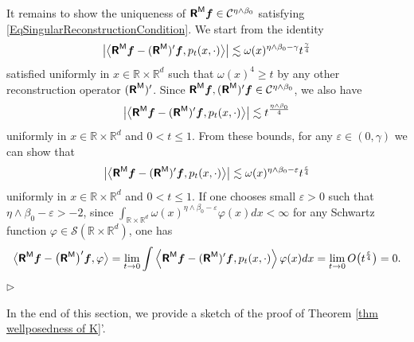 \documentclass[10pt, reqno]{amsart}
\numberwithin{subsection}{section}
\numberwithin{subsubsection}{subsection}
\numberwithin{equation}{section} %
\newenvironment{Dem}[1][\unskip]{%
    \begin{list}{\hspace{1.15cm}{\sf \textbf{{\small Proof #1 --}}}}{%
        \setlength{\topsep}{0pt}%
        \setlength{\leftmargin}{0pt}%
        \setlength{\rightmargin}{0pt}%
        \setlength{\listparindent}{0pt}%
        \setlength{\itemindent}{0pt}%
        \setlength{\parsep}{0pt}%
        \addtolength{\leftmargin}{0pt}%
        \addtolength{\rightmargin}{0pt}%
    } \item }{\hfill $\rhd$\end{list}\smallskip}
\theoremstyle{mystyle}
\theoremstyle{mystyle2}
\theoremstyle{mystyle3}
\newcommand{\bsf}{\boldsymbol{f}}
\newcommand{\ssk}{\smallskip}
\newcommand\bbR{\mathbb{R}}
\newcommand{\mcC}{\mathcal{C}}
\newcommand\mcS{\mathcal{S}}
\begin{document}
\begin{Dem}[of Theorem \ref{thm singular reconstruction}]
\ssk

It remains to show the uniqueness of $\textbf{\textsf{R}}^{\sf M}\bsf\in\mcC^{\eta\wedge\beta_0}$ satisfying \eqref{EqSingularReconstructionCondition}.
We start from the identity
$$
\big\vert \big\langle\textbf{\textsf{R}}^{\sf M}\bsf - (\textbf{\textsf{R}}^{\sf M})'\bsf , p_t(x,\cdot)\big\rangle\big\vert \lesssim \omega(x)^{\eta\wedge\beta_0-\gamma}t^{\frac\gamma4}
$$
satisfied uniformly in $x\in\bbR\times\bbR^d$ such that $\omega(x)^4\ge t$ by any other reconstruction 
operator $(\textbf{\textsf{R}}^{\sf M})'$. Since $\textbf{\textsf{R}}^{\sf M}\bsf,(\textbf{\textsf{R}}^{\sf M})'\bsf\in\mcC^{\eta\wedge\beta_0}$, we also have
$$
\big\vert \big\langle\textbf{\textsf{R}}^{\sf M}\bsf - (\textbf{\textsf{R}}^{\sf M})'\bsf , p_t(x,\cdot)\big\rangle\big\vert \lesssim t^{\frac{\eta\wedge\beta_0}4}
$$
uniformly in $x\in\bbR\times\bbR^d$ and $0< t\le1$. From these bounds, for any $\varepsilon\in(0,\gamma)$ we can show that
$$
\big\vert \big\langle\textbf{\textsf{R}}^{\sf M}\bsf - (\textbf{\textsf{R}}^{\sf M})'\bsf , p_t(x,\cdot)\big\rangle\big\vert \lesssim \omega(x)^{\eta\wedge\beta_0-\varepsilon}t^{\frac{\varepsilon}4}
$$
uniformly in $x\in\bbR\times\bbR^d$ and $0< t\le1$. If one chooses small $\varepsilon>0$ such that $\eta\wedge\beta_0-\varepsilon>-2$, since $\int_{\bbR\times\bbR^d}\omega(x)^{\eta\wedge\beta_0-\varepsilon}\varphi(x)dx<\infty$ for any Schwartz function $\varphi\in\mcS(\bbR\times\bbR^d)$, one has
$$
\big\langle \textbf{\textsf{R}}^{\sf M}\bsf - \big(\textbf{\textsf{R}}^{\sf M}\big)'\bsf , \varphi \big\rangle = \underset{t\rightarrow 0}{\lim} 
\int \Big\langle  \textbf{\textsf{R}}^{\sf M}\bsf - (\textbf{\textsf{R}}^{\sf M})'\bsf , p_t(x,\cdot) \Big\rangle\,\varphi(x)dx = \underset{t\rightarrow 0}{\lim} \, O\big(t^{\frac\varepsilon4}\big) = 0.
$$
\end{Dem}

\medskip

In the end of this section, we provide a sketch of the proof of Theorem \ref{thm wellposedness of K}'.

\medskip
\end{document}
